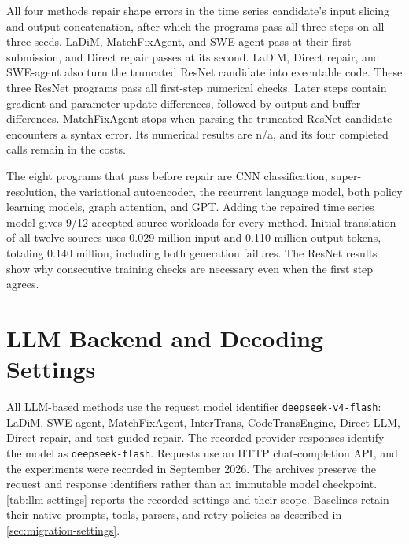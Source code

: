 \documentclass{article}
\begin{document}
All four methods repair shape errors in the time series candidate's input slicing and output concatenation, after which the programs pass all three steps on all three seeds. LaDiM, MatchFixAgent, and SWE-agent pass at their first submission, and Direct repair passes at its second. LaDiM, Direct repair, and SWE-agent also turn the truncated ResNet candidate into executable code. These three ResNet programs pass all first-step numerical checks. Later steps contain gradient and parameter update differences, followed by output and buffer differences. MatchFixAgent stops when parsing the truncated ResNet candidate encounters a syntax error. Its numerical results are n/a, and its four completed calls remain in the costs.

The eight programs that pass before repair are CNN classification, super-resolution, the variational autoencoder, the recurrent language model, both policy learning models, graph attention, and GPT. Adding the repaired time series model gives 9/12 accepted source workloads for every method. Initial translation of all twelve sources uses 0.029 million input and 0.110 million output tokens, totaling 0.140 million, including both generation failures. The ResNet results show why consecutive training checks are necessary even when the first step agrees.

\section{LLM Backend and Decoding Settings}
\label{sec:llm-settings}
All LLM-based methods use the request model identifier \texttt{deepseek-v4-flash}: LaDiM, SWE-agent, MatchFixAgent, InterTrans, CodeTransEngine, Direct LLM, Direct repair, and test-guided repair. The recorded provider responses identify the model as \texttt{deepseek-flash}. Requests use an HTTP chat-completion API, and the experiments were recorded in September 2026. The archives preserve the request and response identifiers rather than an immutable model checkpoint. \cref{tab:llm-settings} reports the recorded settings and their scope. Baselines retain their native prompts, tools, parsers, and retry policies as described in \cref{sec:migration-settings}.
\end{document}
